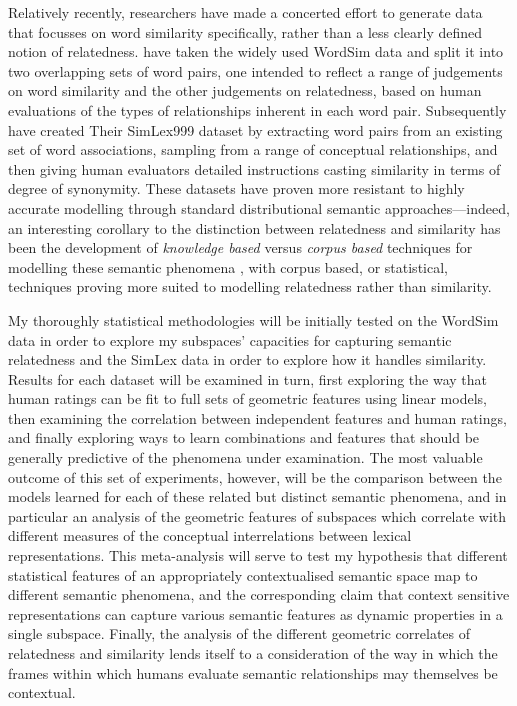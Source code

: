 Relatively recently, researchers have made a concerted effort to generate data that focusses on word similarity specifically, rather than a less clearly defined notion of relatedness.  \cite{AgirreEA2009} have taken the widely used WordSim data and split it into two overlapping sets of word pairs, one intended to reflect a range of judgements on word similarity and the other judgements on relatedness, based on human evaluations of the types of relationships inherent in each word pair.  Subsequently \cite{HillEA2015} have created Their SimLex999 dataset by extracting word pairs from an existing set of word associations, sampling from a range of conceptual relationships, and then giving human evaluators detailed instructions casting similarity in terms of degree of synonymity.  These datasets have proven more resistant to highly accurate modelling through standard distributional semantic approaches---indeed, an interesting corollary to the distinction between relatedness and similarity has been the development of \emph{knowledge based} versus \emph{corpus based} techniques for modelling these semantic phenomena \citep[see][for a discussion]{MihalceaEA2006,HassanEA2011}, with corpus based, or statistical, techniques proving more suited to modelling relatedness rather than similarity.

My thoroughly statistical methodologies will be initially tested on the WordSim data in order to explore my subspaces' capacities for capturing semantic relatedness and the SimLex data in order to explore how it handles similarity.  Results for each dataset will be examined in turn, first exploring the way that human ratings can be fit to full sets of geometric features using linear models, then examining the correlation between independent features and human ratings, and finally exploring ways to learn combinations and features that should be generally predictive of the phenomena under examination.  The most valuable outcome of this set of experiments, however, will be the comparison between the models learned for each of these related but distinct semantic phenomena, and in particular an analysis of the geometric features of subspaces which correlate with different measures of the conceptual interrelations between lexical representations.  This meta-analysis will serve to test my hypothesis that different statistical features of an appropriately contextualised semantic space map to different semantic phenomena, and the corresponding claim that context sensitive representations can capture various semantic features as dynamic properties in a single subspace.  Finally, the analysis of the different geometric correlates of relatedness and similarity lends itself to a consideration of the way in which the frames within which humans evaluate semantic relationships may themselves be contextual.

